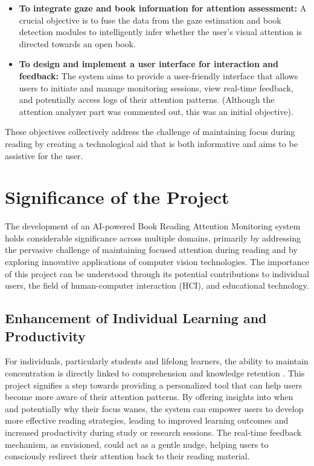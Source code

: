 \begin{itemize}
    \item \textbf{To integrate gaze and book information for attention assessment:} A crucial objective is to fuse the data from the gaze estimation and book detection modules to intelligently infer whether the user's visual attention is directed towards an open book.
    
    \item \textbf{To design and implement a user interface for interaction and feedback:} The system aims to provide a user-friendly interface that allows users to initiate and manage monitoring sessions, view real-time feedback, and potentially access logs of their attention patterns. (Although the attention analyzer part was commented out, this was an initial objective).
    
\end{itemize}
These objectives collectively address the challenge of maintaining focus during reading by creating a technological aid that is both informative and aims to be assistive for the user.

\section{Significance of the Project}
The development of an AI-powered Book Reading Attention Monitoring system holds considerable significance across multiple domains, primarily by addressing the pervasive challenge of maintaining focused attention during reading and by exploring innovative applications of computer vision technologies. The importance of this project can be understood through its potential contributions to individual users, the field of human-computer interaction (HCI), and educational technology.


\subsection{Enhancement of Individual Learning and Productivity}
For individuals, particularly students and lifelong learners, the ability to maintain concentration is directly linked to comprehension and knowledge retention \cite{Albu_AttentionLearning_2023}. This project signifies a step towards providing a personalized tool that can help users become more aware of their attention patterns. By offering insights into when and potentially why their focus wanes, the system can empower users to develop more effective reading strategies, leading to improved learning outcomes and increased productivity during study or research sessions. The real-time feedback mechanism, as envisioned, could act as a gentle nudge, helping users to consciously redirect their attention back to their reading material.

